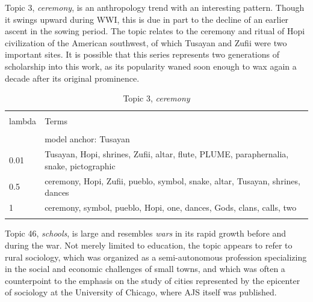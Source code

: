 \documentclass[]{book}
\theoremstyle{definition}
\theoremstyle{definition}
\theoremstyle{definition}
\theoremstyle{remark}
\begin{document}
Topic 3, \emph{ceremony}, is an anthropology trend with an interesting
pattern. Though it swings upward during WWI, this is due in part to the
decline of an earlier ascent in the sowing period. The topic relates to
the ceremony and ritual of Hopi civilization of the American southwest,
of which Tusayan and Zufii were two important sites. It is possible that
this series represents two generations of scholarship into this work, as
its popularity waned soon enough to wax again a decade after its
original prominence.



\begin{table}[!htbp] \centering 
  \caption{Topic 3, \emph{ceremony}} 
  \label{tab:t3-h} 
\begin{tabularx}{\textwidth}{@{\extracolsep{5pt}} lY} 
\\[-1.8ex]\hline 
\hline \\[-1.8ex] 
lambda & Terms \\ 
\hline \\[-1.8ex] 
 & model anchor: Tusayan \\ 
0.01 & Tusayan, Hopi, shrines, Zufii, altar, flute, PLUME, paraphernalia, snake, pictographic \\ 
0.5 & ceremony, Hopi, Zufii, pueblo, symbol, snake, altar, Tusayan, shrines, dances \\ 
1 & ceremony, symbol, pueblo, Hopi, one, dances, Gods, clans, calls, two \\ 
\hline \\[-1.8ex] 
\end{tabularx} 
\end{table}

Topic 46, \emph{schools}, is large and resembles \emph{wars} in its
rapid growth before and during the war. Not merely limited to education,
the topic appears to refer to rural sociology, which was organized as a
semi-autonomous profession specializing in the social and economic
challenges of small towns, and which was often a counterpoint to the
emphasis on the study of cities represented by the epicenter of
sociology at the University of Chicago, where AJS itself was published.
\end{document}
